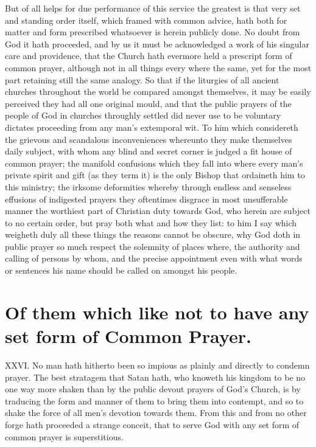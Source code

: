 But of all helps for due performance of this service the greatest is that very set and standing order itself, which framed with common advice, hath both for matter and form prescribed whatsoever is herein publicly done. No doubt from God it hath proceeded, and by us it must be acknowledged a work of his singular care and providence, that the Church hath evermore held a prescript form of common prayer, although not in all things every where the same, yet for the most part retaining still the same analogy. So that if the liturgies of all ancient churches throughout the world be compared amongst themselves, it may be easily perceived they had all one original mould, and that the public prayers of the people of God in churches throughly settled did never use to be voluntary dictates proceeding from any man’s extemporal wit.
To him which considereth the grievous and scandalous inconveniences whereunto they make themselves daily subject, with whom any blind and secret corner is judged a fit house of common prayer; the manifold confusions which they fall into where every man’s private spirit and gift (as they term it) is the only Bishop that ordaineth him to this ministry; the irksome deformities whereby through endless and senseless effusions of indigested prayers they oftentimes disgrace in most unsufferable manner the worthiest part of Christian duty towards God, who herein are subject to no certain order, but pray both what and how they list: to him I say which weigheth duly all these things the reasons cannot be obscure, why God doth in public prayer so much respect the solemnity of places where, the authority and calling of persons by whom, and the precise appointment even with what words or sentences his name should be called on amongst his people.


\section*{Of them which like not to have any set form of Common Prayer.}
XXVI. No man hath hitherto been so impious as plainly and directly to condemn prayer. The best stratagem that Satan hath, who knoweth his kingdom to be no one way more  shaken than by the public devout prayers of God’s Church, is by traducing the form and manner of them to bring them into contempt, and so to shake the force of all men’s devotion towards them.
 From this and from no other forge hath proceeded a strange conceit, that to serve God with any set form of common prayer is superstitious.

